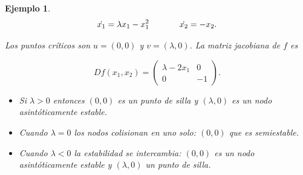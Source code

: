 \documentclass[11pt]{book}
\theoremstyle{definition}
\numberwithin{definition}{section}
\theoremstyle{theorem}
\numberwithin{theorem}{section}
\numberwithin{lemma}{section}
\numberwithin{corollary}{section}
\theoremstyle{plain}
\newtheorem{example}{Ejemplo}
\numberwithin{example}{section}
\begin{document}
\begin{example} \label{ex:transcriticbifurcation}
$$ 
	\dot{x_1} = \lambda x_1 - x_1^2 \hspace{0.5in} \dot{x_2} = -x_2.
$$

Los puntos críticos son $u = (0, 0)$ y $v = (\lambda, 0)$.
La matriz jacobiana de $f$ es

$$ Df(x_1,x_2) = \left( \begin{array}{ll}
	\lambda - 2x_1 & 0 \\
	0 & -1
\end{array} \right). $$

\begin{itemize}
	\item Si $\lambda > 0$ entonces $(0,0)$ es un punto de silla y $(\lambda, 0)$ es un nodo asintóticamente estable.
	\item Cuando $\lambda = 0$ los nodos colisionan en uno solo: $(0,0)$ que es semiestable.
	\item Cuando $\lambda < 0$ la estabilidad se intercambia: $(0,0)$ es un nodo asintóticamente estable y $(\lambda, 0)$ un punto de silla.
\end{itemize}


\end{example}
\end{document}
